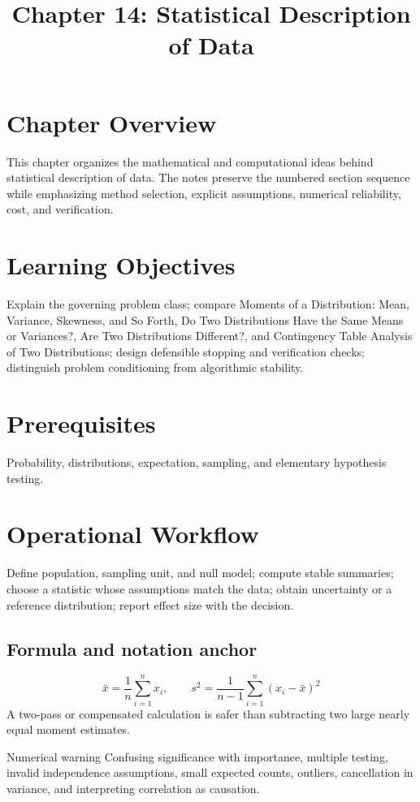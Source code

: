 \documentclass[10pt,letterpaper]{article}
\title{Chapter 14: Statistical Description of Data}
\author{}
\date{}
\begin{document}
\maketitle

\section*{Chapter Overview}
This chapter organizes the mathematical and computational ideas behind statistical description of data. The notes preserve the numbered section sequence while emphasizing method selection, explicit assumptions, numerical reliability, cost, and verification.

\section*{Learning Objectives}
Explain the governing problem class; compare Moments of a Distribution: Mean, Variance, Skewness, and So Forth, Do Two Distributions Have the Same Means or Variances?, Are Two Distributions Different?, and Contingency Table Analysis of Two Distributions; design defensible stopping and verification checks; distinguish problem conditioning from algorithmic stability.

\section*{Prerequisites}
Probability, distributions, expectation, sampling, and elementary hypothesis testing.

\section*{Operational Workflow}
Define population, sampling unit, and null model; compute stable summaries; choose a statistic whose assumptions match the data; obtain uncertainty or a reference distribution; report effect size with the decision.

\subsection*{Formula and notation anchor}
\[
\bar{x}=\frac1n\sum_{i=1}^n x_i,\qquad s^2=\frac1{n-1}\sum_{i=1}^n(x_i-\bar{x})^2
\]
A two-pass or compensated calculation is safer than subtracting two large nearly equal moment estimates.

\begin{warnbox}{Numerical warning}
Confusing significance with importance, multiple testing, invalid independence assumptions, small expected counts, outliers, cancellation in variance, and interpreting correlation as causation.
\end{warnbox}
\end{document}
